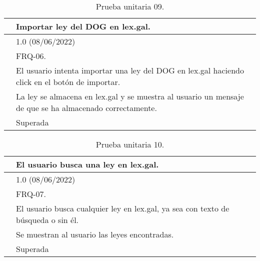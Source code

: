 \begin{table}[H]
\begin{center}
\begin{tabular}{|p{3cm}|p{10cm}|} \hline
\centering {\bf PU-09} & Importar ley del DOG en lex.gal.  \\ \hline\hline
\centering {\bf Versión} & 1.0 (08/06/2022) \\ \hline
\centering {\bf Dependencias} & FRQ-06. \\ \hline
\centering {\bf Descripción} &  El usuario intenta importar una ley del DOG en lex.gal haciendo click en el botón de importar. \\ \hline
\centering {\bf Criterio de aceptación} & La ley se almacena en lex.gal y se muestra al usuario un mensaje de que se ha almacenado correctamente. \\ \hline
\centering {\bf Estado} & Superada \\ \hline
\end{tabular}
\caption{Prueba unitaria 09.}
\label{enlacePU9}
\end{center}
\end{table}

\begin{table}[H]
\begin{center}
\begin{tabular}{|p{3cm}|p{10cm}|} \hline
\centering {\bf PU-10} & El usuario busca una ley en lex.gal.  \\ \hline\hline
\centering {\bf Versión} & 1.0 (08/06/2022) \\ \hline
\centering {\bf Dependencias} & FRQ-07. \\ \hline
\centering {\bf Descripción} &  El usuario busca cualquier ley en lex.gal, ya sea con texto de búsqueda o sin él. \\ \hline
\centering {\bf Criterio de aceptación} & Se muestran al usuario las leyes encontradas. \\ \hline
\centering {\bf Estado} & Superada \\ \hline
\end{tabular}
\caption{Prueba unitaria 10.}
\label{enlacePU10}
\end{center}
\end{table}

